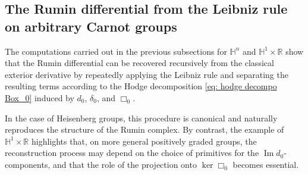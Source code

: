 \documentclass[dvipsnames]{amsart}
\theoremstyle{definition}
\theoremstyle{definition}
\numberwithin{equation}{section}
\newcommand{\R}{\mathbb{R}}
\renewcommand{\H}{\mathbb{H}}
\begin{document}
\subsection{The Rumin differential from the Leibniz rule on arbitrary Carnot groups}

The computations carried out in the previous subsections for \(\H^n\) and \(\H^1\times\R\) show that the Rumin differential can be recovered recursively from the classical exterior derivative by repeatedly applying the Leibniz rule and separating the resulting terms according to the Hodge decomposition \eqref{eq: hodge decompo Box_0} induced by \(d_0\), \(\delta_0\), and \(\Box_0\). 

In the case of Heisenberg groups, this procedure is canonical and naturally reproduces the structure of the Rumin complex. By contrast, the example of \(\H^1\times\R\) highlights that, on more general positively graded groups, the reconstruction process may depend on the choice of primitives for the \(\operatorname{Im}d_0\)-components, and that the role of the projection onto \(\ker\Box_0\) becomes essential.
\end{document}
